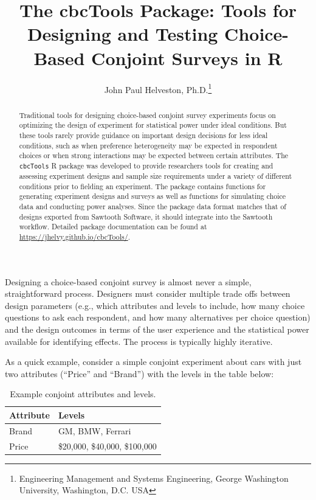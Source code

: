 \documentclass[
  12pt,
]{article}
\title{The cbcTools Package: Tools for Designing and Testing
Choice-Based Conjoint Surveys in R}
\author{John Paul Helveston, Ph.D.\footnote{Engineering Management and
  Systems Engineering, George Washington University, Washington, D.C.
  USA}}
\date{}
\begin{document}
\maketitle
\begin{abstract}
Traditional tools for designing choice-based conjoint survey experiments
focus on optimizing the design of experiment for statistical power under
ideal conditions. But these tools rarely provide guidance on important
design decisions for less ideal conditions, such as when preference
heterogeneity may be expected in respondent choices or when strong
interactions may be expected between certain attributes. The
\texttt{cbcTools} R package was developed to provide researchers tools
for creating and assessing experiment designs and sample size
requirements under a variety of different conditions prior to fielding
an experiment. The package contains functions for generating experiment
designs and surveys as well as functions for simulating choice data and
conducting power analyses. Since the package data format matches that of
designs exported from Sawtooth Software, it should integrate into the
Sawtooth workflow. Detailed package documentation can be found at
\url{https://jhelvy.github.io/cbcTools/}.
\end{abstract}

Designing a choice-based conjoint survey is almost never a simple,
straightforward process. Designers must consider multiple trade offs
between design parameters (e.g., which attributes and levels to include,
how many choice questions to ask each respondent, and how many
alternatives per choice question) and the design outcomes in terms of
the user experience and the statistical power available for identifying
effects. The process is typically highly iterative.

As a quick example, consider a simple conjoint experiment about cars
with just two attributes (``Price'' and ``Brand'') with the levels in
the table below:

\begin{table}

\caption{\label{tab:unnamed-chunk-1}Example conjoint attributes and levels.}
\centering
\begin{tabular}[t]{ll}
\toprule
Attribute & Levels\\
\midrule
Brand & GM, BMW, Ferrari\\
Price & \$20,000, \$40,000, \$100,000\\
\bottomrule
\end{tabular}
\end{table}
\end{document}
